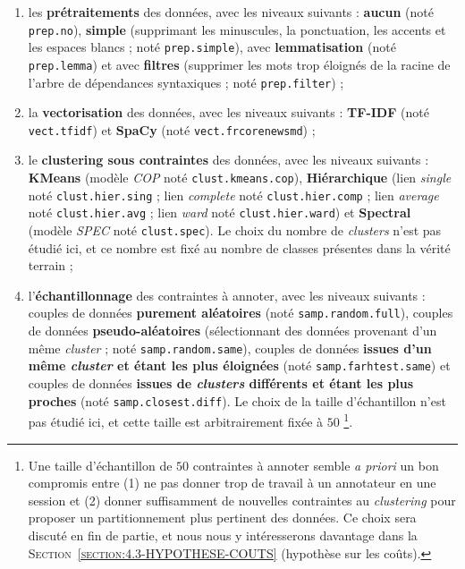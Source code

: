 			\begin{enumerate}
				\item les \textbf{prétraitements} des données, avec les niveaux suivants :
				\textbf{aucun} (noté \texttt{prep.no}), \textbf{simple} (supprimant les minuscules, la ponctuation, les accents et les espaces blancs ; noté \texttt{prep.simple}), avec \textbf{lemmatisation} (noté \texttt{prep.lemma}) et avec \textbf{filtres} (supprimer les mots trop éloignés de la racine de l'arbre de dépendances syntaxiques ; noté \texttt{prep.filter}) ;
				\item la \textbf{vectorisation} des données, avec les niveaux suivants :
				\textbf{TF-IDF} (noté \texttt{vect.tfidf}) et \textbf{SpaCy} (noté \texttt{vect.frcorenewsmd}) ;
				\item le \textbf{clustering sous contraintes} des données, avec les niveaux suivants :
				\textbf{KMeans} (modèle \textit{COP} noté \texttt{clust.kmeans.cop}), \textbf{Hiérarchique} (lien \textit{single} noté \texttt{clust.hier.sing} ; lien \textit{complete} noté \texttt{clust.hier.comp} ; lien \textit{average} noté \texttt{clust.hier.avg} ; lien \textit{ward} noté \texttt{clust.hier.ward}) et \textbf{Spectral} (modèle \textit{SPEC} noté \texttt{clust.spec}).
				Le choix du nombre de \textit{clusters} n'est pas étudié ici, et ce nombre est fixé au nombre de classes présentes dans la vérité terrain ;
				\item l'\textbf{échantillonnage} des contraintes à annoter, avec les niveaux suivants :
				couples de données \textbf{purement aléatoires} (noté \texttt{samp.random.full}), couples de données \textbf{pseudo-aléatoires} (sélectionnant des données provenant d'un même \textit{cluster} ; noté \texttt{samp.random.same}), couples de données \textbf{issues d'un même \textit{cluster} et étant les plus éloignées} (noté \texttt{samp.farhtest.same}) et couples de données \textbf{issues de \textit{clusters} différents et étant les plus proches} (noté \texttt{samp.closest.diff}).
				Le choix de la taille d'échantillon n'est pas étudié ici, et cette taille est arbitrairement fixée à $50$ \footnote{
					Une taille d'échantillon de $50$ contraintes à annoter semble \textit{a priori} un bon compromis entre (1) ne pas donner trop de travail à un annotateur en une session et (2) donner suffisamment de nouvelles contraintes au \textit{clustering} pour proposer un partitionnement plus pertinent des données.
					Ce choix sera discuté en fin de partie, et nous nous y intéresserons davantage dans la \textsc{Section~\ref{section:4.3-HYPOTHESE-COUTS}} (hypothèse sur les coûts).
				}.
			\end{enumerate}
			
